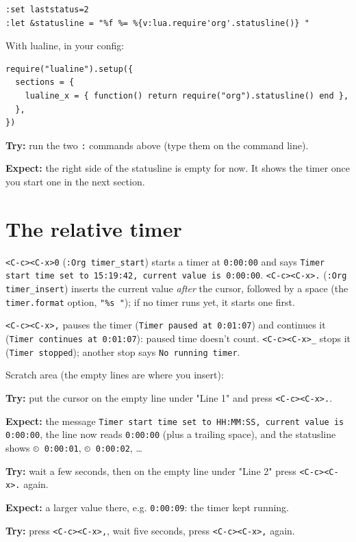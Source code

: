 \begin{verbatim}
:set laststatus=2
:let &statusline = "%f %= %{v:lua.require'org'.statusline()} "
\end{verbatim}

With lualine, in your config:

\begin{verbatim}
require("lualine").setup({
  sections = {
    lualine_x = { function() return require("org").statusline() end },
  },
})
\end{verbatim}

\textbf{Try:} run the two \texttt{:} commands above (type them on the command line).

\textbf{Expect:} the right side of the statusline is empty for now. It shows the
timer once you start one in the next section.
\section{The relative timer}
\label{sec:orgbdb4163}
\texttt{<C-c><C-x>0} (\texttt{:Org timer\_start}) starts a timer at \texttt{0:00:00} and says
\texttt{Timer start time set to 15:19:42, current value is 0:00:00}.
\texttt{<C-c><C-x>.} (\texttt{:Org timer\_insert}) inserts the current value \emph{after} the
cursor, followed by a space (the \texttt{timer.format} option, \texttt{"\%s "}); if no timer
runs yet, it starts one first.

\texttt{<C-c><C-x>,} pauses the timer (\texttt{Timer paused at 0:01:07}) and continues it
(\texttt{Timer continues at 0:01:07}): paused time doesn't count.
\texttt{<C-c><C-x>\_} stops it (\texttt{Timer stopped}); another stop says
\texttt{No running timer}.

Scratch area (the empty lines are where you insert):


\textbf{Try:} put the cursor on the empty line under "Line 1" and press
\texttt{<C-c><C-x>.}.

\textbf{Expect:} the message \texttt{Timer start time set to HH:MM:SS, current value is
0:00:00}, the line now reads \texttt{0:00:00} (plus a trailing space), and the
statusline shows \texttt{⏲ 0:00:01}, \texttt{⏲ 0:00:02}, \ldots{}

\textbf{Try:} wait a few seconds, then on the empty line under "Line 2" press
\texttt{<C-c><C-x>.} again.

\textbf{Expect:} a larger value there, e.g. \texttt{0:00:09}: the timer kept running.

\textbf{Try:} press \texttt{<C-c><C-x>,}, wait five seconds, press \texttt{<C-c><C-x>,} again.

